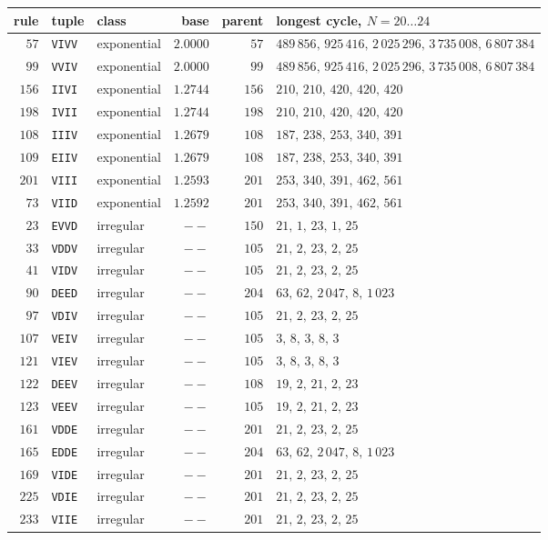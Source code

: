 \begin{tabular}{rllrrl}
\hline
rule & tuple & class & base & parent & longest cycle, $N=20\ldots24$ \\
\hline
$57$ & \texttt{VIVV} & exponential & $2.0000$ & $57$ & $489\,856,\,925\,416,\,2\,025\,296,\,3\,735\,008,\,6\,807\,384$ \\
$99$ & \texttt{VVIV} & exponential & $2.0000$ & $99$ & $489\,856,\,925\,416,\,2\,025\,296,\,3\,735\,008,\,6\,807\,384$ \\
$156$ & \texttt{IIVI} & exponential & $1.2744$ & $156$ & $210,\,210,\,420,\,420,\,420$ \\
$198$ & \texttt{IVII} & exponential & $1.2744$ & $198$ & $210,\,210,\,420,\,420,\,420$ \\
$108$ & \texttt{IIIV} & exponential & $1.2679$ & $108$ & $187,\,238,\,253,\,340,\,391$ \\
$109$ & \texttt{EIIV} & exponential & $1.2679$ & $108$ & $187,\,238,\,253,\,340,\,391$ \\
$201$ & \texttt{VIII} & exponential & $1.2593$ & $201$ & $253,\,340,\,391,\,462,\,561$ \\
$73$ & \texttt{VIID} & exponential & $1.2592$ & $201$ & $253,\,340,\,391,\,462,\,561$ \\
$23$ & \texttt{EVVD} & irregular & $--$ & $150$ & $21,\,1,\,23,\,1,\,25$ \\
$33$ & \texttt{VDDV} & irregular & $--$ & $105$ & $21,\,2,\,23,\,2,\,25$ \\
$41$ & \texttt{VIDV} & irregular & $--$ & $105$ & $21,\,2,\,23,\,2,\,25$ \\
$90$ & \texttt{DEED} & irregular & $--$ & $204$ & $63,\,62,\,2\,047,\,8,\,1\,023$ \\
$97$ & \texttt{VDIV} & irregular & $--$ & $105$ & $21,\,2,\,23,\,2,\,25$ \\
$107$ & \texttt{VEIV} & irregular & $--$ & $105$ & $3,\,8,\,3,\,8,\,3$ \\
$121$ & \texttt{VIEV} & irregular & $--$ & $105$ & $3,\,8,\,3,\,8,\,3$ \\
$122$ & \texttt{DEEV} & irregular & $--$ & $108$ & $19,\,2,\,21,\,2,\,23$ \\
$123$ & \texttt{VEEV} & irregular & $--$ & $105$ & $19,\,2,\,21,\,2,\,23$ \\
$161$ & \texttt{VDDE} & irregular & $--$ & $201$ & $21,\,2,\,23,\,2,\,25$ \\
$165$ & \texttt{EDDE} & irregular & $--$ & $204$ & $63,\,62,\,2\,047,\,8,\,1\,023$ \\
$169$ & \texttt{VIDE} & irregular & $--$ & $201$ & $21,\,2,\,23,\,2,\,25$ \\
$225$ & \texttt{VDIE} & irregular & $--$ & $201$ & $21,\,2,\,23,\,2,\,25$ \\
$233$ & \texttt{VIIE} & irregular & $--$ & $201$ & $21,\,2,\,23,\,2,\,25$ \\
\hline
\end{tabular}
